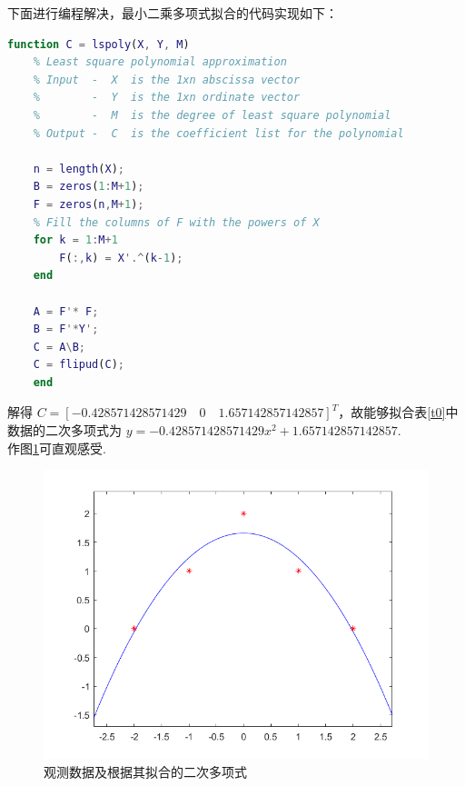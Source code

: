 \documentclass[UTF8]{ctexart}
\begin{document}
下面进行编程解决，最小二乘多项式拟合的代码实现如下：
\begin{lstlisting}[language=matlab]
	function C = lspoly(X, Y, M)
	% Least square polynomial approximation
	% Input  -  X  is the 1xn abscissa vector
	%        -  Y  is the 1xn ordinate vector
	%        -  M  is the degree of least square polynomial
	% Output -  C  is the coefficient list for the polynomial
	
	n = length(X);
	B = zeros(1:M+1);
	F = zeros(n,M+1);
	% Fill the columns of F with the powers of X
	for k = 1:M+1
		F(:,k) = X'.^(k-1);
	end
	
	A = F'* F;
	B = F'*Y';
	C = A\B;
	C = flipud(C);
	end
\end{lstlisting}
解得 $C=[-0.428571428571429 \quad 0 \quad 1.657142857142857]^{T}$，故能够拟合表\ref{t0}中数据的二次多项式为 $y=-0.428571428571429x^{2} + 1.657142857142857$.\\
作图\ref{fig:figure1}可直观感受.
\begin{figure}[H]
	\begin{center}
		\includegraphics[width=0.7\columnwidth]{figures/lspoly.png}
		\caption{观测数据及根据其拟合的二次多项式}
		\label{fig:figure1}
	\end{center}
\end{figure}
\end{document}
